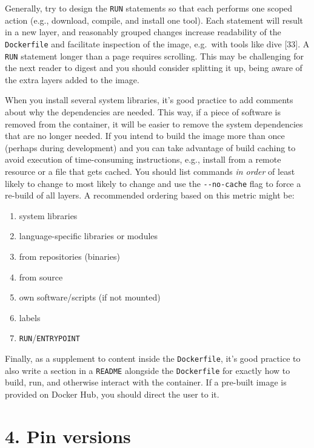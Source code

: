 \documentclass[10pt,letterpaper]{article}
\providecommand{\tightlist}{%
  \setlength{\itemsep}{0pt}\setlength{\parskip}{0pt}}
\begin{document}
Generally, try to design the \texttt{RUN} statements so that each
performs one scoped action (e.g., download, compile, and install one
tool). Each statement will result in a new layer, and reasonably grouped
changes increase readability of the \texttt{Dockerfile} and facilitate
inspection of the image, e.g.~with tools like dive {[}33{]}. A
\texttt{RUN} statement longer than a page requires scrolling. This may
be challenging for the next reader to digest and you should consider
splitting it up, being aware of the extra layers added to the image.

When you install several system libraries, it's good practice to add
comments about why the dependencies are needed. This way, if a piece of
software is removed from the container, it will be easier to remove the
system dependencies that are no longer needed. If you intend to build
the image more than once (perhaps during development) and you can take
advantage of build caching to avoid execution of time-consuming
instructions, e.g., install from a remote resource or a file that gets
cached. You should list commands \emph{in order} of least likely to
change to most likely to change and use the \texttt{-\/-no-cache} flag
to force a re-build of all layers. A recommended ordering based on this
metric might be:

\begin{enumerate}
\def\labelenumi{\arabic{enumi}.}
\tightlist
\item
  system libraries
\item
  language-specific libraries or modules
\item
  from repositories (binaries)
\item
  from source
\item
  own software/scripts (if not mounted)
\item
  labels
\item
  \texttt{RUN}/\texttt{ENTRYPOINT}
\end{enumerate}

Finally, as a supplement to content inside the \texttt{Dockerfile}, it's
good practice to also write a section in a \texttt{README} alongside the
\texttt{Dockerfile} for exactly how to build, run, and otherwise
interact with the container. If a pre-built image is provided on Docker
Hub, you should direct the user to it.

\hypertarget{pin-versions}{%
\section*{4. Pin versions}\label{pin-versions}}
\end{document}
